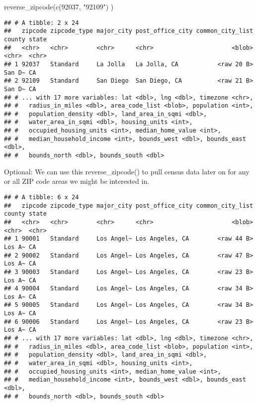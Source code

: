 \documentclass[
]{article}
\newenvironment{Shaded}{\begin{snugshade}}{\end{snugshade}}
\newcommand{\CommentTok}[1]{\textcolor[rgb]{0.56,0.35,0.01}{\textit{#1}}}
\newcommand{\FunctionTok}[1]{\textcolor[rgb]{0.00,0.00,0.00}{#1}}
\newcommand{\NormalTok}[1]{#1}
\newcommand{\OtherTok}[1]{\textcolor[rgb]{0.56,0.35,0.01}{#1}}
\newcommand{\SpecialCharTok}[1]{\textcolor[rgb]{0.00,0.00,0.00}{#1}}
\newcommand{\StringTok}[1]{\textcolor[rgb]{0.31,0.60,0.02}{#1}}
\begin{document}
\begin{Shaded}
\begin{Highlighting}[]
\FunctionTok{reverse\_zipcode}\NormalTok{(}\FunctionTok{c}\NormalTok{(}\StringTok{\textquotesingle{}92037\textquotesingle{}}\NormalTok{, }\StringTok{"92109"}\NormalTok{) )}
\end{Highlighting}
\end{Shaded}

\begin{verbatim}
## # A tibble: 2 x 24
##   zipcode zipcode_type major_city post_office_city common_city_list county state
##   <chr>   <chr>        <chr>      <chr>                      <blob> <chr>  <chr>
## 1 92037   Standard     La Jolla   La Jolla, CA           <raw 20 B> San D~ CA   
## 2 92109   Standard     San Diego  San Diego, CA          <raw 21 B> San D~ CA   
## # ... with 17 more variables: lat <dbl>, lng <dbl>, timezone <chr>,
## #   radius_in_miles <dbl>, area_code_list <blob>, population <int>,
## #   population_density <dbl>, land_area_in_sqmi <dbl>,
## #   water_area_in_sqmi <dbl>, housing_units <int>,
## #   occupied_housing_units <int>, median_home_value <int>,
## #   median_household_income <int>, bounds_west <dbl>, bounds_east <dbl>,
## #   bounds_north <dbl>, bounds_south <dbl>
\end{verbatim}

Optional: We can use this reverse\_zipcode() to pull census data later
on for any or all ZIP code areas we might be interested in.

\begin{Shaded}
\end{Shaded}

\begin{verbatim}
## # A tibble: 6 x 24
##   zipcode zipcode_type major_city post_office_city common_city_list county state
##   <chr>   <chr>        <chr>      <chr>                      <blob> <chr>  <chr>
## 1 90001   Standard     Los Angel~ Los Angeles, CA        <raw 44 B> Los A~ CA   
## 2 90002   Standard     Los Angel~ Los Angeles, CA        <raw 47 B> Los A~ CA   
## 3 90003   Standard     Los Angel~ Los Angeles, CA        <raw 23 B> Los A~ CA   
## 4 90004   Standard     Los Angel~ Los Angeles, CA        <raw 34 B> Los A~ CA   
## 5 90005   Standard     Los Angel~ Los Angeles, CA        <raw 34 B> Los A~ CA   
## 6 90006   Standard     Los Angel~ Los Angeles, CA        <raw 23 B> Los A~ CA   
## # ... with 17 more variables: lat <dbl>, lng <dbl>, timezone <chr>,
## #   radius_in_miles <dbl>, area_code_list <blob>, population <int>,
## #   population_density <dbl>, land_area_in_sqmi <dbl>,
## #   water_area_in_sqmi <dbl>, housing_units <int>,
## #   occupied_housing_units <int>, median_home_value <int>,
## #   median_household_income <int>, bounds_west <dbl>, bounds_east <dbl>,
## #   bounds_north <dbl>, bounds_south <dbl>
\end{verbatim}
\end{document}
